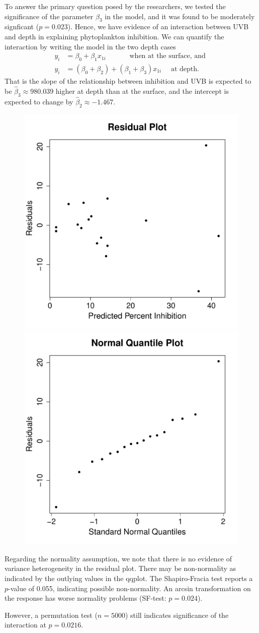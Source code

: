 \documentclass{homework}
\begin{document}
To answer the primary question posed by the researchers, we tested the significance of the parameter $\beta_3$ in the model, and it was found to be moderately signficant ($p = 0.023$). Hence, we have evidence of an interaction between UVB and depth in explaining phytoplankton inhibition.  We can quantify the interaction by writing the model in the two depth cases
\begin{align*}
  y_i &= \beta_0 + \beta_1 x_{1i} \quad\quad\quad\text{ when at the surface, and }\\
  y_i &= (\beta_0 + \beta_2) + (\beta_1+ \beta_3)  x_{1i} \quad\text{ at depth. }
\end{align*}
That is the slope of the relationship between inhibition and UVB is expected to
be $\hat\beta_3 \approx 980.039$ higher at depth than at the surface, and the
intercept is expected to change by $\hat\beta_2 \approx -1.467$.
\begin{figure}
\includegraphics[width=.25\textwidth]{ozone_resid.pdf}\includegraphics[width=.25\textwidth]{ozone_qqplot.pdf}
\end{figure}
Regarding the normality assumption, we note that there is no evidence of variance heterogeneity in the residual
plot.  There may be non-normality as indicated by the outlying values in the qqplot. The
Shapiro-Fracia test reports a $p$-value of 0.055, indicating possible
non-normality. An arcsin transformation on the response has worse normality problems (SF-test: $p=0.024$).

However, a permutation test ($n=5000$) still indicates significance of the interaction at $p = 0.0216$.
\end{document}
